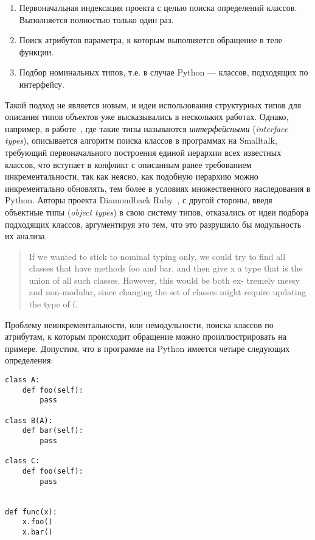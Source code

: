 \begin{enumerate}
    \item{Первоначальная индексация проекта с целью поиска определений классов.
      Выполняется полностью только один раз.}
    \item{Поиск атрибутов параметра, к которым выполняется обращение в теле
        функции.}
    \item{Подбор номинальных типов, т.е. в случае Python --- классов, подходящих
      по интерфейсу.}
\end{enumerate}

Такой подход не является новым, и идеи использования структурных
типов для описания типов объектов уже высказывались в нескольких работах. 
Однако, например, в работе~\cite{Pluquet2009}, где такие типы называются
\emph{интерфейсными} (\emph{interface types}), описывается алгоритм поиска
классов в программах на Smalltalk, требующий первоначального построения единой
иерархии всех известных классов, что вступает в конфликт с описанным ранее
требованием инкрементальности, так как неясно, как подобную иерархию
можно инкрементально обновлять, тем более в условиях множественного наследования
в Python.  Авторы проекта Diamondback Ruby~\cite{Furr2009}, с другой стороны,
введя объектные типы (\emph{object types}) в свою систему типов, отказались от
идеи подбора подходящих классов, аргументируя это тем, что это разрушило бы
модульность их анализа.

\begin{quote}
  If we wanted to stick to nominal typing only, we could try to find all
  classes that have methods foo and bar, and then give x a type that
  is the union of all such classes. However, this would be both ex-
  tremely messy and non-modular, since changing the set of classes
  might require updating the type of f.
\end{quote}

Проблему неинкрементальности, или немодульности, поиска классов по атрибутам, к
которым происходит обращение можно проиллюстрировать на примере. Допустим, что
в программе на Python имеется четыре следующих определения:

\begin{lstlisting}
class A:
    def foo(self):
        pass

class B(A):
    def bar(self):
        pass

class C:
    def foo(self):
        pass


def func(x):
    x.foo()
    x.bar()

\end{lstlisting}

